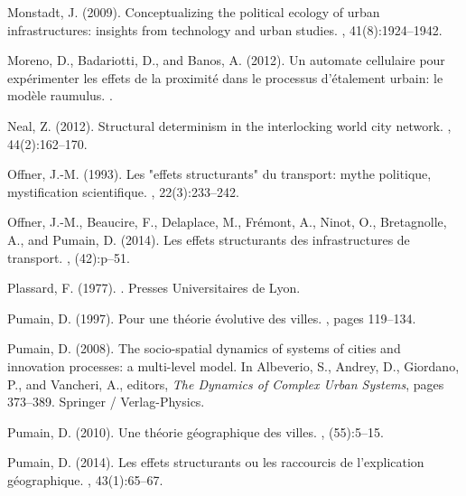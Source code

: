 \documentclass[11pt]{article}
\begin{document}
\begin{thebibliography}{}
Monstadt, J. (2009).
\newblock Conceptualizing the political ecology of urban infrastructures:
  insights from technology and urban studies.
, 41(8):1924--1942.

Moreno, D., Badariotti, D., and Banos, A. (2012).
\newblock Un automate cellulaire pour exp{\'e}rimenter les effets de la
  proximit{\'e} dans le processus d'{\'e}talement urbain: le mod{\`e}le
  raumulus.
.

Neal, Z. (2012).
\newblock Structural determinism in the interlocking world city network.
, 44(2):162--170.

Offner, J.-M. (1993).
\newblock Les "effets structurants" du transport: mythe politique,
  mystification scientifique.
, 22(3):233--242.

Offner, J.-M., Beaucire, F., Delaplace, M., Fr{\'e}mont, A., Ninot, O.,
  Bretagnolle, A., and Pumain, D. (2014).
\newblock Les effets structurants des infrastructures de transport.
, (42):p--51.

Plassard, F. (1977).
.
\newblock Presses Universitaires de Lyon.

Pumain, D. (1997).
\newblock Pour une th{\'e}orie {\'e}volutive des villes.
, pages 119--134.

Pumain, D. (2008).
\newblock The socio-spatial dynamics of systems of cities and innovation
  processes: a multi-level model.
\newblock In Albeverio, S., Andrey, D., Giordano, P., and Vancheri, A.,
  editors, {\em The Dynamics of Complex Urban Systems}, pages 373--389.
  Springer / Verlag-Physics.

Pumain, D. (2010).
\newblock Une th{\'e}orie g{\'e}ographique des villes.
,
  (55):5--15.

Pumain, D. (2014).
\newblock Les effets structurants ou les raccourcis de l'explication
  g{\'e}ographique.
, 43(1):65--67.


\end{thebibliography}
\end{document}
